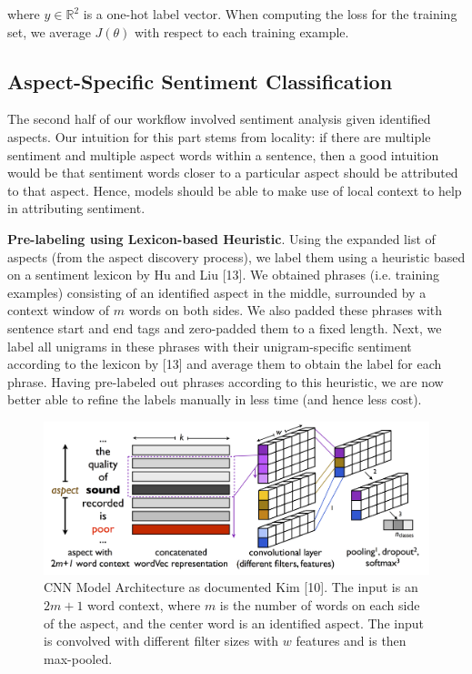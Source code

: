\documentclass{article} %
\begin{document}
where $y \in \mathbb{R}^2$ is a one-hot label vector. When computing the loss for the training set, we average $J(\theta)$ with respect to each training example.

\subsection{Aspect-Specific Sentiment Classification}
The second half of our workflow involved sentiment analysis given identified aspects. Our intuition for this part stems from locality: if there are multiple sentiment and multiple aspect words within a sentence, then a good intuition would be that sentiment words closer to a particular aspect should be attributed to that aspect. Hence, models should be able to make use of local context to help in attributing sentiment.

\textbf{Pre-labeling using Lexicon-based Heuristic}.
Using the expanded list of aspects (from the aspect discovery process), we label them using a heuristic based on a sentiment lexicon by Hu and Liu [13]. We obtained phrases (i.e. training examples) consisting of an identified aspect in the middle, surrounded by a context window of $m$ words on both sides. We also padded these phrases with sentence start and end tags and zero-padded them to a fixed length. Next, we label all unigrams in these phrases with their unigram-specific sentiment according to the lexicon by [13] and average them to obtain the label for each phrase. Having pre-labeled out phrases according to this heuristic, we are now better able to refine the labels manually in less time (and hence less cost).


\begin{figure}[ht]
\begin{center}
\includegraphics[width=\columnwidth]{model_architecture.png}
\end{center}
\caption{CNN Model Architecture as documented Kim [10]. The input is an $2m+1$ word context, where $m$ is the number of words on each side of the aspect, and the center word is an identified aspect. The input is convolved with different filter sizes with $w$ features and is then max-pooled.}
\label{architecture}
\end{figure}
\end{document}
